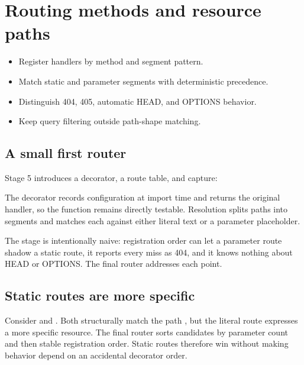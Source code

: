 \chapter{Routing methods and resource paths}

\begin{objectives}
\begin{itemize}
  \item Register handlers by method and segment pattern.
  \item Match static and parameter segments with deterministic precedence.
  \item Distinguish 404, 405, automatic HEAD, and OPTIONS behavior.
  \item Keep query filtering outside path-shape matching.
\end{itemize}
\end{objectives}

\section{A small first router}

Stage 5 introduces a decorator, a route table, and  capture:


The decorator records configuration at import time and returns the original
handler, so the function remains directly testable. Resolution splits paths into
segments and matches each against either literal text or a parameter placeholder.

The stage is intentionally naive: registration order can let a parameter route
shadow a static route, it reports every miss as 404, and it knows nothing about
HEAD or OPTIONS. The final router addresses each point.

\section{Static routes are more specific}

Consider  and . Both structurally match
the path , but the literal route expresses a more specific
resource. The final router sorts candidates by parameter count and then stable
registration order. Static routes therefore win without making behavior depend
on an accidental decorator order.

